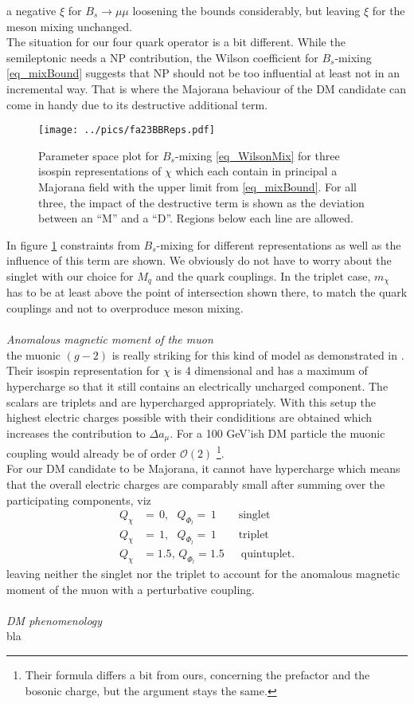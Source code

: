 a negative $\xi$ for $B_s\rightarrow \mu\mu$ loosening the bounds considerably, but leaving $\xi$ for the meson mixing unchanged.\\
\noindent The situation for our four quark operator is a bit different. While the semileptonic needs a NP contribution, the Wilson coefficient 
for $B_s$-mixing \eqref{eq_mixBound} suggests that NP should not be too influential at least not in an incremental way. That is where the Majorana
behaviour of the DM candidate can come in handy due to its destructive additional term. 
\begin{figure}[t]
 \texttt{[image: ../pics/fa23BBReps.pdf]}
 \caption{Parameter space plot for $B_s$-mixing \eqref{eq_WilsonMix} for three isospin representations of $\chi$ which each contain in principal a 
 Majorana field with the upper limit from \eqref{eq_mixBound}. For all three, the impact of the destructive term is shown as the deviation between
 an ``M'' and a ``D''. Regions below each line are allowed.}
 \label{pic_BsMixRepsMajorana}
\end{figure}
In figure \ref{pic_BsMixRepsMajorana} constraints from $B_s$-mixing for different representations as well as the influence of this term are shown.
We obviously do not have to worry about the singlet with our choice for $M_q$ and the quark couplings. In the triplet case, $m_\chi$ has to be at
least above the point of intersection shown there, to match the quark couplings and not to overproduce meson mixing.
\\ \\ \textit{Anomalous magnetic moment of the muon}\\
\noindent the muonic $(g-2)$ is really striking for this kind of model as demonstrated in \cite{Grip}. Their isospin representation for $\chi$ is
4 dimensional and has a maximum of hypercharge so that it still contains an electrically uncharged component. The scalars are triplets and 
are hypercharged appropriately. With this setup the highest electric charges possible with their condiditions are obtained which increases the 
contribution to $\Delta a_\mu$. For a 100 GeV'ish DM particle the muonic coupling would already be of order $\mathcal{O}(2)$ \footnote{Their 
formula differs a bit from ours, concerning the prefactor and the bosonic charge, but the argument stays the same.}.\\
\noindent For our DM candidate to be Majorana, it cannot have hypercharge which means that the overall electric charges are comparably small
after summing over the participating components, viz
\begin{align}
 Q_\chi &= \,0,\,\,\,\,Q_{\Phi_l} = \,1 \qquad \text{singlet}\\
 Q_\chi &= \,1,\,\,\,\,Q_{\Phi_l} = \,1 \qquad \text{triplet}\\
 Q_\chi &= 1.5,\,Q_{\Phi_l} = 1.5\,\,\, \quad \text{quintuplet}.
\end{align}
leaving neither the singlet nor the triplet to account for the anomalous magnetic moment of the muon with a perturbative coupling.
\\ \\ \textit{DM phenomenology}\\
\noindent bla




